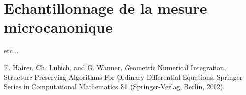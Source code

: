 \documentclass[a4paper,10pt,twoside]{report}
\begin{document}
%
%

\chapter{Echantillonnage de la mesure microcanonique}

etc...

\begin{thebibliography}{10}

 {\sc E. Hairer, Ch. Lubich, and G. Wanner},
{\emph Geometric Numerical Integration, Structure-Preserving 
Algorithms For Ordinary Differential Equations},
Springer Series in Computational Mathematics \textbf{31}
(Springer-Verlag, Berlin, 2002). 

\end{thebibliography}
\end{document}
